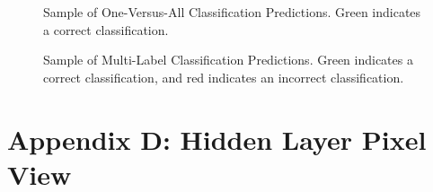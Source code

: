 \documentclass[]{article}
\begin{document}
\begin{figure}[h!]
	\centering	
	\caption{Sample of One-Versus-All Classification Predictions. Green indicates a correct classification.}
\end{figure}

\begin{figure}[h!]
	\centering	
	\caption{Sample of Multi-Label Classification Predictions. Green indicates a correct classification, and red indicates an incorrect classification.}
\end{figure}

\newpage
\section*{Appendix D: Hidden Layer Pixel View}
\end{document}
